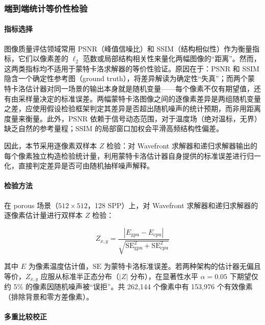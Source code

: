 \subsubsection{端到端统计等价性检验}

\paragraph{指标选择}

图像质量评估领域常用 PSNR（峰值信噪比）和 SSIM（结构相似性）作为衡量指标，它们以像素差的 $\ell_2$ 范数或局部结构相关性来量化两幅图像的``距离''。然而，这两类指标均不适用于蒙特卡洛求解器的等价性验证。原因在于：PSNR 和 SSIM 隐含一个确定性参考图（ground truth），将差异解读为确定性``失真''；而两个蒙特卡洛估计器对同一场景的输出本身就是随机变量——每个像素不仅有期望值，还有由采样量决定的标准误差。两幅蒙特卡洛图像之间的逐像素差异是两组随机变量之差，应使用假设检验框架判定其差异是否超出随机噪声的统计预期，而非用距离度量来衡量。此外，PSNR 依赖于信号动态范围，对于温度场（绝对温标，无界）缺乏自然的参考量程；SSIM 的局部窗口加权会平滑高频结构性偏差。

因此，本节采用逐像素双样本 $Z$ 检验：对 Wavefront 求解器和递归求解器输出的每个像素独立构造检验统计量，利用蒙特卡洛估计器自身提供的标准误差进行归一化，直接判定差异是否可由随机抽样噪声解释。

\paragraph{检验方法}

在 porous 场景（$512 \times 512$，128 SPP）上，对 Wavefront 求解器和递归求解器的逐像素估计量进行双样本 $Z$ 检验：

\begin{equation}
  \label{eq:z-test}
  Z_{x,y} = \frac{|E_{\mathrm{gpu}} - E_{\mathrm{cpu}}|}{\sqrt{\mathrm{SE}_{\mathrm{gpu}}^2 + \mathrm{SE}_{\mathrm{cpu}}^2}}
\end{equation}

\noindent 其中 $E$ 为像素温度估计值，$\mathrm{SE}$ 为蒙特卡洛标准误差。若两种架构的估计器无偏且等价，$Z_{x,y}$ 应服从标准半正态分布（$|Z|$ 分布），在显著性水平 $\alpha = 0.05$ 下期望仅约 5\% 的像素因随机噪声被``误拒''。共 262{,}144 个像素中有 153{,}976 个有效像素（排除背景和零方差像素）。

\paragraph{多重比较校正}

